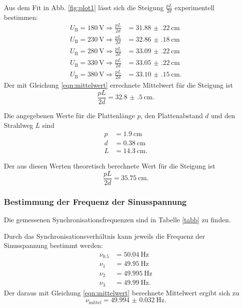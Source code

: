 \noindent Aus dem Fit in Abb. \ref{fig:plot1} lässt sich die Steigung  
$\frac{p L}{2 d}$ experimentell bestimmen:
\begin{align*} 
   U_\text{B} = \SI{180}{\volt} \Rightarrow \frac{p L}{2 d} &= \SI{31.88(22)}{\centi\meter} \\
    U_\text{B} = \SI{230}{\volt} \Rightarrow \frac{p L}{2 d} &= \SI{32.86(18)}{\centi\meter} \\
    U_\text{B} = \SI{280}{\volt} \Rightarrow \frac{p L}{2 d} &= \SI{33.09(22)}{\centi\meter} \\
    U_\text{B} = \SI{330}{\volt} \Rightarrow \frac{p L}{2 d} &= \SI{33.05(22)}{\centi\meter} \\
    U_\text{B} = \SI{380}{\volt} \Rightarrow \frac{p L}{2 d} &= \SI{33.10(15)}{\centi\meter}.
\end{align*}
Der mit Gleichung \eqref{eqn:mittelwert}
errechnete Mittelwert für die Steigung ist
\begin{equation*}
    \frac{p L}{2 d} = \SI{32.8(5)}{\centi\meter}.
\end{equation*}

\noindent Die angegebenen Werte für die Plattenlänge $p$,
den Plattenabstand $d$ und den Strahlweg $L$ sind
\begin{align*}
    p &= \SI{1.9}{\centi\meter} \\
    d &= \SI{0.38}{\centi\meter} \\
    L &= \SI{14.3}{\centi\meter}.
\end{align*}

\noindent Der aus diesen Werten theoretisch berechnete Wert für die
Steigung ist
\begin{equation*}
    \frac{p L}{2 d} = \SI{35.75}{\centi\meter}.
\end{equation*}

\subsubsection{Bestimmung der Frequenz der Sinusspannung}
Die gemessenen Synchronisationsfrequenzen sind in Tabelle
\ref{tabb} zu finden. 


\noindent Durch das Synchronisationsverhältnis
kann jeweils die Frequenz der Sinusspannung bestimmt werden:
\begin{align*}
    \nu_{0.5} &= \SI{50.04}{\hertz} \\
    \nu_1 &= \SI{49.95}{\hertz} \\
    \nu_2 &= \SI{49.995}{\hertz} \\
    \nu_3 &= \SI{49.99}{\hertz}.
\end{align*}
Der daraus mit Gleichung \eqref{eqn:mittelwert}
berechnete Mittelwert ergibt sich zu
\begin{equation*}
    \nu_\text{mittel} = \SI{49.994(32)}{\hertz}.
\end{equation*}


